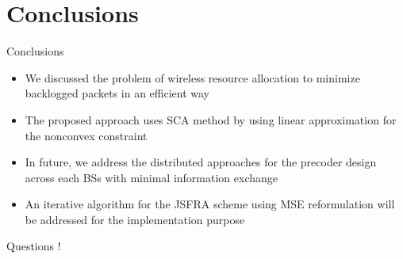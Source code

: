 \documentclass[10pt]{beamer}
\begin{document}
\section{Conclusions}

\begin{frame}{Conclusions}
\begin{itemize}
\item We discussed the problem of wireless resource allocation to minimize backlogged packets in an efficient way
\item The proposed approach uses \ac{SCA} method by using linear approximation for the nonconvex constraint
\item In future, we address the distributed approaches for the precoder design across each \acsp{BS} with minimal information exchange
\item An iterative algorithm for the \acs{JSFRA} scheme using \acs{MSE} reformulation will be addressed for the implementation purpose
\end{itemize}
\end{frame}


\begin{frame}
\begin{center}
{\color{blue}\Huge{Questions !}}
\end{center}
\end{frame}
\end{document}

